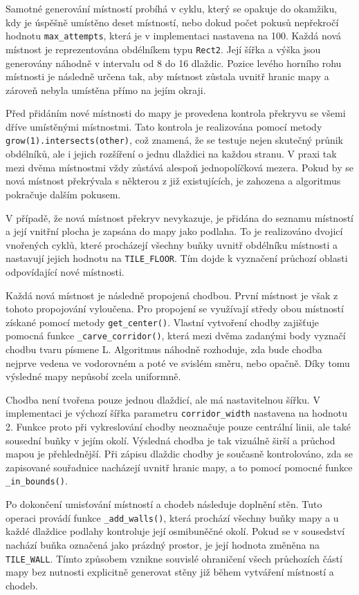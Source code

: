 \documentclass[
  program=itk,
  biblatex,
  figures=false,
  glossaries,
  index
]{kidiplom}
\begin{document}
Samotné generování místností probíhá v cyklu, který se opakuje do okamžiku, kdy je úspěšně umístěno deset místností, nebo dokud počet pokusů nepřekročí hodnotu \texttt{max\_attempts}, která je v implementaci nastavena na 100. Každá nová místnost je reprezentována obdélníkem typu \texttt{Rect2}. Její šířka a výška jsou generovány náhodně v intervalu od 8 do 16 dlaždic. Pozice levého horního rohu místnosti je následně určena tak, aby místnost zůstala uvnitř hranic mapy a zároveň nebyla umístěna přímo na jejím okraji.

Před přidáním nové místnosti do mapy je provedena kontrola překryvu se všemi dříve umístěnými místnostmi. Tato kontrola je realizována pomocí metody \texttt{grow(1).intersects(other)}, což znamená, že se testuje nejen skutečný průnik obdélníků, ale i jejich rozšíření o jednu dlaždici na každou stranu. V praxi tak mezi dvěma místnostmi vždy zůstává alespoň jednopolíčková mezera. Pokud by se nová místnost překrývala s některou z již existujících, je zahozena a algoritmus pokračuje dalším pokusem.

V případě, že nová místnost překryv nevykazuje, je přidána do seznamu místností a její vnitřní plocha je zapsána do mapy jako podlaha. To je realizováno dvojicí vnořených cyklů, které procházejí všechny buňky uvnitř obdélníku místnosti a nastavují jejich hodnotu na \texttt{TILE\_FLOOR}. Tím dojde k vyznačení průchozí oblasti odpovídající nové místnosti.

Každá nová místnost je následně propojená chodbou. První místnost je však z tohoto propojování vyloučena.
Pro propojení se využívají středy obou místností získané pomocí metody \texttt{get\_center()}. Vlastní vytvoření chodby zajišťuje pomocná funkce \texttt{\_carve\_corridor()}, která mezi dvěma zadanými body vyznačí chodbu tvaru písmene L. Algoritmus náhodně rozhoduje, zda bude chodba nejprve vedena ve vodorovném a poté ve svislém směru, nebo opačně. Díky tomu výsledné mapy nepůsobí zcela uniformně.

Chodba není tvořena pouze jednou dlaždicí, ale má nastavitelnou šířku. V implementaci je výchozí šířka parametru \texttt{corridor\_width} nastavena na hodnotu 2. Funkce proto při vykreslování chodby neoznačuje pouze centrální linii, ale také sousední buňky v jejím okolí. Výsledná chodba je tak vizuálně širší a průchod mapou je přehlednější. Při zápisu dlaždic chodby je současně kontrolováno, zda se zapisované souřadnice nacházejí uvnitř hranic mapy, a to pomocí pomocné funkce \texttt{\_in\_bounds()}.

Po dokončení umisťování místností a chodeb následuje doplnění stěn.
Tuto operaci provádí funkce \texttt{\_add\_walls()}, která prochází všechny buňky mapy a u každé dlaždice podlahy kontroluje její osmibuněčné okolí. Pokud se v sousedství nachází buňka označená jako prázdný prostor, je její hodnota změněna na \texttt{TILE\_WALL}. Tímto způsobem vznikne souvislé ohraničení všech průchozích částí mapy bez nutnosti explicitně generovat stěny již během vytváření místností a chodeb.
\end{document}
